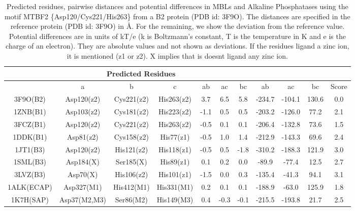 \begin{center}
\begin{table*}
\caption { Predicted residues, pairwise distances and potential differences in MBLs and Alkaline Phosphatases using the motif MTBF2 \{Asp120/Cys221/His263\} from a B2 protein (PDB id: 3F9O). 
The distances are specified in the reference protein (PDB id: 3F9O) in {\AA}. For the remaining, we show the deviation from the reference value. 
Potential differences are in units of kT/e (k is Boltzmann's constant, T is the temperature in K and e is the charge of an electron). They are absolute values and not shown as deviations. 
If the residues ligand a zinc ion, it is mentioned (z1 or z2). X implies that is doesnt ligand any zinc ion.
} 
\begin{tabular}{ c| c c c |   c c c | c c c | c   }
\hline
\multicolumn{8}{c}{Predicted Residues}{Distances            |}{       Potentials} \\
\hline
 & a & b & c & ab & ac & bc & ab & ac & bc & Score  \\ 
\hline
3F9O(B2) & Asp120(z2) & Cys221(z2) & His263(z2) & 3.7& 6.5& 5.8& -234.7 & -104.1 & 130.6  &     0.0  \\
1ZNB(B1) & Asp103(z2) & Cys181(z2) & His223(z2) & -1.1 & 0.5 &    0.5 & -203.2 & -126.0  &77.2 &     2.1  \\
3FCZ(B1) & Asp120(z2) & Cys221(z2) & His263(z2) & -0.5& 0.1& 0.1& -206.4 & -132.8 & 73.6  &     1.5  \\
1DDK(B1) & Asp81(z2) & Cys158(z2) & His77(z1) & -0.5& 1.0& 1.4& -212.9 & -143.3 & 69.6  &     2.4  \\
1JT1(B3) & Asp120(z2) & His121(z2) & His118(z1) & -0.5& 0.5& -1.8& -310.2 & -188.3 & 121.9  &     3.0  \\
1SML(B3) & Asp184(X) & Ser185(X) & His89(z1) & 0.1& 0.2& 0.0& -89.9 & -77.4 & 12.5  &     2.7  \\
3LVZ(B3) & Asp70(X) & His106(z2) & His101(z1) &  -1.5 &    0.0 &    0.3 & -135.4 & -41.3 & 94.1 &     3.1  \\
1ALK(ECAP) & Asp327(M1) & His412(M1) & His331(M1) & 0.2& 0.1& 0.1& -188.9 & -63.0 & 125.9 &     1.8  \\
1K7H(SAP) & Asp37(M2,M3) & Ser86(M2) & His149(M3) & 0.4& -0.3& -0.1& -215.5 & -193.8 & 21.7  &     2.5  \\
\hline
\end{tabular} \label{tableB2}
\end{table*}
\end{center}

